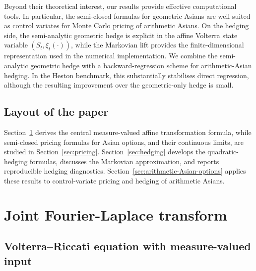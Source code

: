 \documentclass[10pt,a4paper,reqno]{amsart}
\theoremstyle{plain}
\theoremstyle{definition}
\theoremstyle{remark}
\theoremstyle{example}
\begin{document}
Beyond their theoretical interest, our results provide effective computational tools. In particular, the semi-closed formulas for geometric Asians are well suited as control variates for Monte Carlo pricing of arithmetic Asians. On the hedging side, the semi-analytic geometric hedge is explicit in the affine Volterra state variable $(S_t,\xi_t(\cdot))$, while the Markovian lift provides the finite-dimensional representation used in the numerical implementation. We combine the semi-analytic geometric hedge with a backward-regression scheme for arithmetic-Asian hedging. In the Heston benchmark, this substantially stabilises direct regression, although the resulting improvement over the geometric-only hedge is small.


\subsection{Layout of the paper}

Section~\ref{sec:volterra-heston} derives the central measure-valued affine transformation formula, while semi-closed pricing formulas for Asian options, and their continuous limits, are studied in Section~\ref{sec:pricing}. Section~\ref{sec:hedging} develops the quadratic-hedging formulas, discusses the Markovian approximation, and reports reproducible hedging diagnostics. Section~\ref{sec:arithmetic-Asian-options} applies these results to control-variate pricing and hedging of arithmetic Asians.



\section{Joint Fourier-Laplace transform}\label{sec:volterra-heston}

\subsection{Volterra--Riccati equation with measure-valued input}\label{sec:VolterraRiccati}
\end{document}
